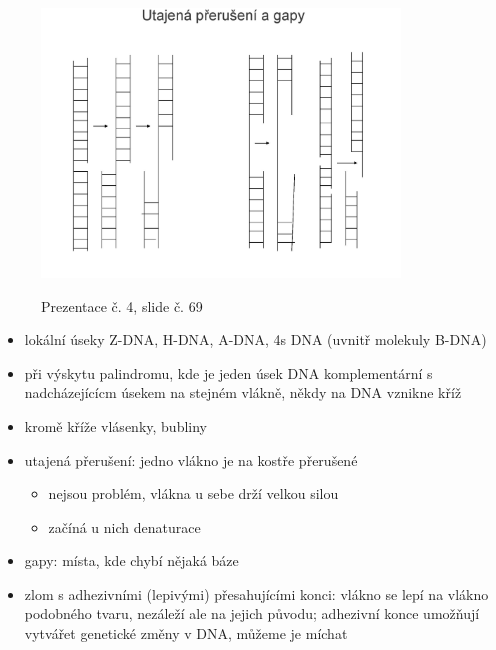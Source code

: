 \documentclass[DIV=8]{scrreprt}
\begin{document}
\begin{figure}
    \caption{Prezentace č. 4, slide č. 69}
    \includegraphics[width=0.85\textwidth]{slides-4/slide-69.jpg}
    \centering
    \label{slides-4-slide-69}
\end{figure}

\begin{itemize}[nosep]
    \item lokální úseky Z-DNA, H-DNA, A-DNA, 4s DNA (uvnitř molekuly B-DNA)
    \item při výskytu palindromu, kde je jeden úsek DNA komplementární s nadcházejícícm úsekem na stejném vlákně, někdy na DNA vznikne kříž
    \item kromě kříže vlásenky, bubliny
    \item utajená přerušení: jedno vlákno je na kostře přerušené
\begin{itemize}[nosep]
    \item nejsou problém, vlákna u sebe drží velkou silou
    \item začíná u nich denaturace
\end{itemize}

    \item gapy: místa, kde chybí nějaká báze
    \item zlom s adhezivními (lepivými) přesahujícími konci: vlákno se lepí na vlákno podobného tvaru, nezáleží ale na jejich původu; adhezivní konce umožňují vytvářet genetické změny v DNA, můžeme je míchat
\end{itemize}
\end{document}
